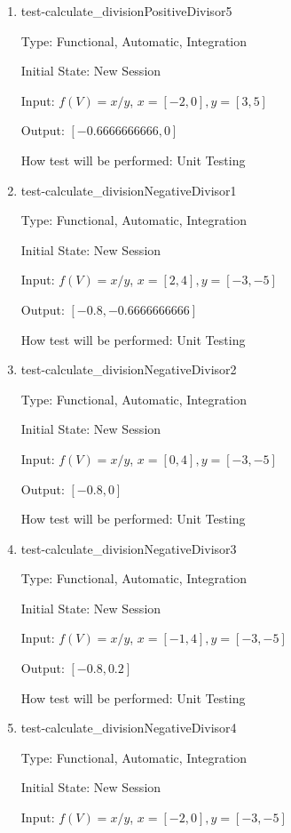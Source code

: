 \documentclass[12pt, titlepage]{article}
\begin{document}
\begin{enumerate}
	\item{test-calculate\_divisionPositiveDivisor5}
	
	Type: Functional, Automatic, Integration
	
	Initial State: New Session
	
	Input: $f(V) = x / y$, $x = [-2,0], y = [3,5]$
	
	Output: $[-0.6666666666,0]$
	
	How test will be performed: Unit Testing\\
	
	\item{test-calculate\_divisionNegativeDivisor1}
	
	Type: Functional, Automatic, Integration
	
	Initial State: New Session
	
	Input: $f(V) = x / y$, $x = [2,4], y = [-3,-5]$
	
	Output: $[-0.8,-0.6666666666]$
	
	How test will be performed: Unit Testing\\
	
	\item{test-calculate\_divisionNegativeDivisor2}
	
	Type: Functional, Automatic, Integration
	
	Initial State: New Session
	
	Input: $f(V) = x / y$, $x = [0,4], y = [-3,-5]$
	
	Output: $[-0.8,0]$
	
	How test will be performed: Unit Testing\\
	
	\item{test-calculate\_divisionNegativeDivisor3}
	
	Type: Functional, Automatic, Integration
	
	Initial State: New Session
	
	Input: $f(V) = x / y$, $x = [-1,4], y = [-3,-5]$
	
	Output: $[-0.8,0.2]$
	
	How test will be performed: Unit Testing\\
	
	\item{test-calculate\_divisionNegativeDivisor4}
	
	Type: Functional, Automatic, Integration
	
	Initial State: New Session
	
	Input: $f(V) = x / y$, $x = [-2,0], y = [-3,-5]$
	

\end{enumerate}
\end{document}
